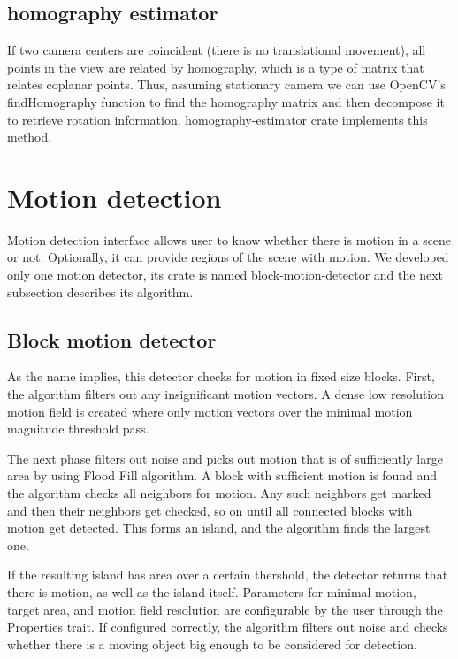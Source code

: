 \documentclass[11pt,english]{report}
\begin{document}
\subsection{homography estimator}

If two camera centers are coincident (there is no translational movement), all points in the view are related by homography\cite{hartley_zisserman_2004}, which is a type of matrix that relates coplanar points. Thus, assuming stationary camera we can use OpenCV's findHomography function to find the homography matrix and then decompose it to retrieve rotation information. homography-estimator crate implements this method.

\section{Motion detection}

Motion detection interface allows user to know whether there is motion in a scene or not. Optionally, it can provide regions of the scene with motion. We developed only one motion detector, its crate is named block-motion-detector and the next subsection describes its algorithm.

\subsection{Block motion detector}

As the name implies, this detector checks for motion in fixed size blocks. First, the algorithm filters out any insignificant motion vectors. A dense low resolution motion field is created where only motion vectors over the minimal motion magnitude threshold pass.

The next phase filters out noise and picks out motion that is of sufficiently large area by using Flood Fill algorithm. A block with sufficient motion is found and the algorithm checks all neighbors for motion. Any such neighbors get marked and then their neighbors get checked, so on until all connected blocks with motion get detected. This forms an island, and the algorithm finds the largest one.

If the resulting island has area over a certain thershold, the detector returns that there is motion, as well as the island itself. Parameters for minimal motion, target area, and motion field resolution are configurable by the user through the Properties trait. If configured correctly, the algorithm filters out noise and checks whether there is a moving object big enough to be considered for detection.
\end{document}
